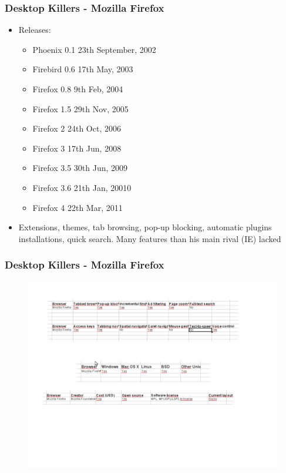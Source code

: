 \documentclass{beamer}
\begin{document}
\begin{frame}
\frametitle{Desktop Killers - Mozilla Firefox}

\begin{itemize}
\item Releases:
	\begin{itemize}
	\item Phoenix 0.1 23th September, 2002
	\item Firebird 0.6 17th May, 2003
	\item Firefox 0.8 9th Feb, 2004
	\item Firefox 1.5 29th Nov, 2005
	\item Firefox 2 24th Oct, 2006
	\item Firefox 3 17th Jun, 2008
	\item Firefox 3.5 30th Jun, 2009
	\item Firefox 3.6 21th Jan, 20010
	\item Firefox 4  22th Mar, 2011
	\end{itemize}
\item Extensions, themes, tab browsing, pop-up blocking, automatic plugins installations, quick search. Many features than his main rival (IE) lacked
\end{itemize}
\end{frame}


\begin{frame}
\frametitle{Desktop Killers - Mozilla Firefox}
\begin{figure}
 \includegraphics[scale=0.35]{figs/firefox-features}

\end{figure}
\end{frame}
\end{document}
